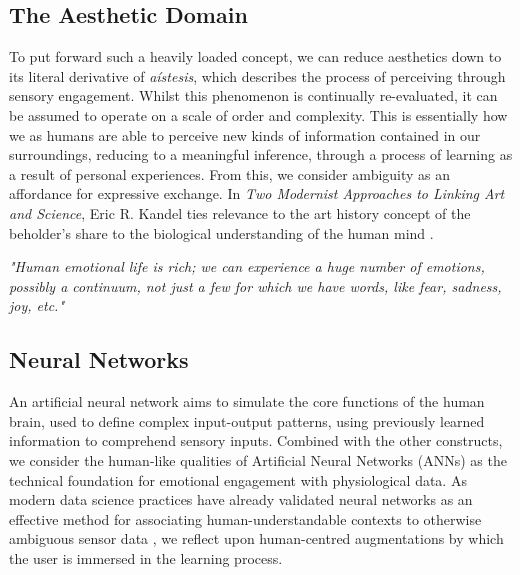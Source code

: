 
\subsection{The Aesthetic Domain}

To put forward such a heavily loaded concept, we can reduce aesthetics down to its literal derivative of \textit{aístesis}, which describes the process of perceiving through sensory engagement. Whilst this phenomenon is continually re-evaluated, it can be assumed to operate on a scale of order and complexity. This is essentially how we as humans are able to perceive new kinds of information contained in our surroundings, reducing to a meaningful inference, through a process of learning as a result of personal experiences. From this, we consider ambiguity as an affordance for expressive exchange. In \textit{Two Modernist Approaches to Linking Art and Science}, Eric R. Kandel ties relevance to the art history concept of the beholder's share to the biological understanding of the human mind \cite{kandel_two_2013}.

\textit{"Human emotional life is rich; we can experience a huge number of emotions, possibly a continuum, not just a few for which we have words, like fear, sadness, joy, etc."} \citeauthor{perlovsky_aesthetic_2014} \cite{perlovsky_aesthetic_2014}


\subsection{Neural Networks}

An artificial neural network aims to simulate the core functions of the human brain, used to define complex input-output patterns, using previously learned information to comprehend sensory inputs. Combined with the other constructs, we consider the human-like qualities of Artificial Neural Networks (ANNs) as the technical foundation for emotional engagement with physiological data. As modern data science practices have already validated neural networks as an effective method for associating human-understandable contexts to otherwise ambiguous sensor data \cite{bota_review_2019}, we reflect upon human-centred augmentations by which the user is immersed in the learning process.

